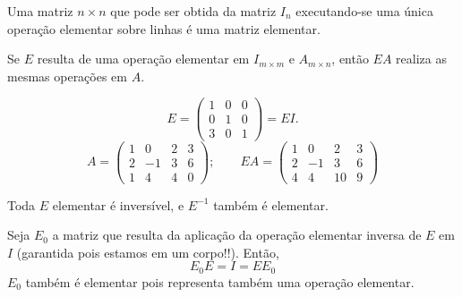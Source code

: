 \begin{defi}
   Uma matriz $n\times n$ que pode ser obtida da matriz $I_n$ executando-se uma única operação elementar sobre linhas é uma matriz elementar.
\end{defi}

Se $E$ resulta de uma operação elementar em $I_{m\times m}$ e $A_{m\times n}$, então $EA$ realiza as mesmas operações em $A$.

\begin{exemplo*}
	\begin{equation*}
		E = \begin{pmatrix} 1&0&0\\0&1&0\\3&0&1 \end{pmatrix} = EI.
	\end{equation*}
	\begin{equation*}
	   A = \begin{pmatrix} 1&0&2&3\\ 2&-1&3&6\\1&4&4&0\end{pmatrix}; \qquad EA =
\begin{pmatrix} 1&0&2&3\\ 2&-1&3&6\\ 4&4&10&9\end{pmatrix}
	\end{equation*}
\end{exemplo*} 

\begin{teo}
   Toda $E$ elementar é inversível, e $E^{-1}$ também é elementar.
\end{teo}
\bpr
	Seja $E_0$ a matriz que resulta da aplicação da operação elementar
inversa de $E$ em $I$ (garantida pois estamos em um corpo!!). Então,
	$$E_0 E = I = EE_0$$
	$E_0$ também é elementar pois representa também uma operação elementar.
\epr

